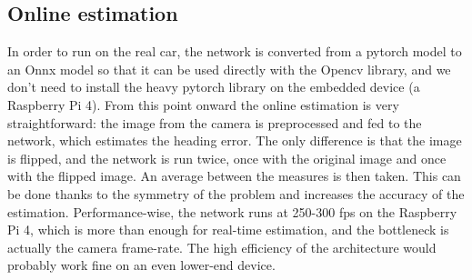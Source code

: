 \documentclass[a4paper,12pt,sort&compress]{article}
\begin{document}

\subsection*{Online estimation}
    In order to run on the real car, the network is converted from a pytorch model to an Onnx model
    so that it can be used directly with the Opencv library, and we don't need to install the heavy
    pytorch library on the embedded device (a Raspberry Pi 4). From this point onward the online
    estimation is very straightforward: the image from the camera is preprocessed and fed to the
    network, which estimates the heading error. The only difference is that the image is flipped,
    and the network is run twice, once with the original image and once with the flipped image. An
    average between the measures is then taken. This can be done thanks to the symmetry of the
    problem and increases the accuracy of the estimation. Performance-wise, the network runs at
    250-300 fps on the Raspberry Pi 4, which is more than enough for real-time estimation, and the
    bottleneck is actually the camera frame-rate. The high efficiency of the architecture would
    probably work fine on an even lower-end device. 
\end{document}
